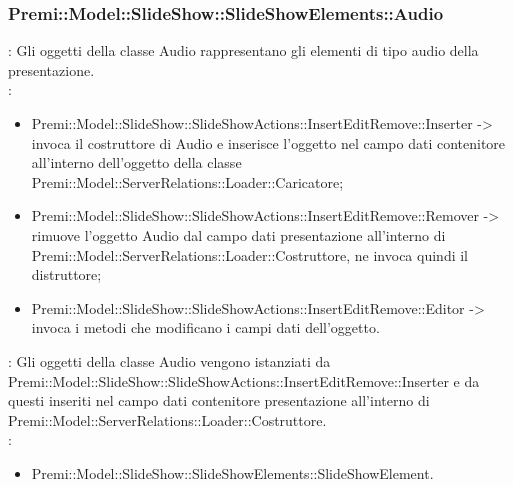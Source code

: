 {                    \subsubsection{Premi::Model::SlideShow::SlideShowElements::Audio}{
				\textbf{\tipo}: Gli oggetti della classe Audio rappresentano gli elementi di tipo audio della presentazione.\\
				\textbf{\relaz}: 
				\begin{itemize}
					\item Premi::Model::SlideShow::SlideShowActions::InsertEditRemove::Inserter -> invoca il costruttore di Audio e inserisce l’oggetto nel campo dati contenitore all’interno dell’oggetto della classe Premi::Model::ServerRelations::Loader::Caricatore;
                    \item Premi::Model::SlideShow::SlideShowActions::InsertEditRemove::Remover -> rimuove l’oggetto Audio dal campo dati presentazione all’interno di Premi::Model::ServerRelations::Loader::Costruttore, ne invoca quindi il distruttore;
                    \item Premi::Model::SlideShow::SlideShowActions::InsertEditRemove::Editor -> invoca i metodi che modificano i campi dati dell'oggetto.
				\end{itemize}	
                \textbf{\interfacce}: Gli oggetti della classe Audio vengono istanziati da Premi::Model::SlideShow::SlideShowActions::InsertEditRemove::Inserter e da questi inseriti nel campo dati contenitore presentazione all’interno di Premi::Model::ServerRelations::Loader::Costruttore.\\
                \textbf{\base}:  
                    \begin{itemize}
                    \item Premi::Model::SlideShow::SlideShowElements::SlideShowElement.
                    \end{itemize}
                    }
}
